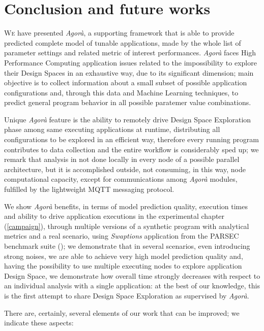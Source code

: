 \chapter{Conclusion and future works}\label{end}

\lettrine{W}{e} have presented \textit{Agorà}, a supporting framework that is able to provide predicted complete model of tunable applications, made by the whole list of parameter settings and related metric of interest performances. \textit{Agorà} faces High Performance Computing application issues related to the impossibility to explore their Design Spaces in an exhaustive way, due to its significant dimension; main objective is to collect information about a small subset of possible application configurations and, through this data and Machine Learning techniques, to predict general program behavior in all possible paratemer value combinations.

Unique \textit{Agorà} feature is the ability to remotely drive Design Space Exploration phase among same executing applications at runtime, distributing all configurations to be explored in an efficient way, therefore every running program contributes to data collection and the entire workflow is considerably sped up; we remark that analysis in not done locally in every node of a possible parallel architecture, but it is accomplished outside, not consuming, in this way, node computational capacity, except for communications among \textit{Agorà} modules, fulfilled by the lightweight MQTT messaging protocol.

We show \textit{Agorà} benefits, in terms of model prediction quality, execution times and ability to drive application executions in the experimental chapter (\ref{campaign}), through multiple versions of a synthetic program with analytical metrics and a real scenario, using \textit{Swaptions} application from the PARSEC benchmark suite (\cite{bienia2008parsec}); we demonstrate that in several scenarios, even introducing strong noises, we are able to achieve very high model prediction quality and, having the possibility to use multiple executing nodes to explore application Design Space, we demonstrate how overall time strongly decreases with respect to an individual analysis with a single application: at the best of our knowledge, this is the first attempt to share Design Space Exploration as supervised by \textit{Agorà}.

There are, certainly, several elements of our work that can be improved; we indicate these aspects:

